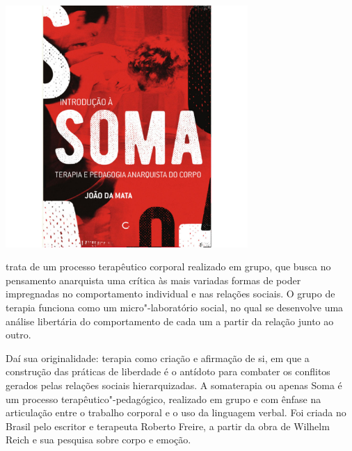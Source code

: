 \pagebreak

\hspace{.5cm}

\begin{center}
\hspace*{-2.5cm}
\hspace*{2.5cm}\includegraphics[width=92mm]{./grid/soma.jpg}
\end{center}

\hspace*{-7cm}\hrulefill\hspace*{-7cm}

\medskip

 trata de um processo terapêutico corporal realizado em grupo, que busca no pensamento anarquista uma crítica às mais variadas formas de poder impregnadas no comportamento individual e nas relações sociais. O grupo de terapia funciona como um micro"-laboratório social, no qual se desenvolve uma análise libertária do comportamento de cada um a partir da relação junto ao outro.

Daí sua originalidade: terapia como criação e afirmação de si, em que a construção das práticas de liberdade é o antídoto para combater os conflitos gerados pelas relações sociais hierarquizadas. A somaterapia ou apenas Soma é um processo terapêutico"-pedagógico, realizado em grupo e com ênfase na articulação entre o trabalho corporal e o uso da linguagem verbal. Foi criada no Brasil pelo escritor e terapeuta Roberto Freire, a partir da obra de Wilhelm Reich e sua pesquisa sobre corpo e emoção.

